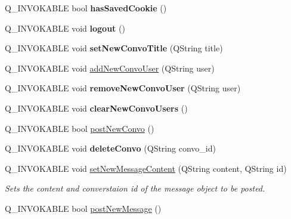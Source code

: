 \begin{DoxyCompactItemize}
\item 
\hypertarget{classHttpManager_ae8be30969ab90769d320474cba273cea}{Q\-\_\-\-I\-N\-V\-O\-K\-A\-B\-L\-E bool {\bfseries has\-Saved\-Cookie} ()}\label{classHttpManager_ae8be30969ab90769d320474cba273cea}

\item 
\hypertarget{classHttpManager_a69067bb2736567a01f69595fac80398b}{Q\-\_\-\-I\-N\-V\-O\-K\-A\-B\-L\-E void {\bfseries logout} ()}\label{classHttpManager_a69067bb2736567a01f69595fac80398b}

\item 
\hypertarget{classHttpManager_abc77a75cfec070dc986707bdab152c49}{Q\-\_\-\-I\-N\-V\-O\-K\-A\-B\-L\-E void {\bfseries set\-New\-Convo\-Title} (Q\-String title)}\label{classHttpManager_abc77a75cfec070dc986707bdab152c49}

\item 
Q\-\_\-\-I\-N\-V\-O\-K\-A\-B\-L\-E void \hyperlink{classHttpManager_ac345aafb8d298dd34573971f3a7ad242}{add\-New\-Convo\-User} (Q\-String user)
\item 
\hypertarget{classHttpManager_afc880ea260ad8d393259f44762799278}{Q\-\_\-\-I\-N\-V\-O\-K\-A\-B\-L\-E void {\bfseries remove\-New\-Convo\-User} (Q\-String user)}\label{classHttpManager_afc880ea260ad8d393259f44762799278}

\item 
\hypertarget{classHttpManager_aa8bf26e7de4b36c0e96ee06baccfd933}{Q\-\_\-\-I\-N\-V\-O\-K\-A\-B\-L\-E void {\bfseries clear\-New\-Convo\-Users} ()}\label{classHttpManager_aa8bf26e7de4b36c0e96ee06baccfd933}

\item 
Q\-\_\-\-I\-N\-V\-O\-K\-A\-B\-L\-E bool \hyperlink{classHttpManager_a1abaa98249ae82e1742b3ffbcf33fa4f}{post\-New\-Convo} ()
\item 
\hypertarget{classHttpManager_a97d6513de9a9c490dcd982921d320104}{Q\-\_\-\-I\-N\-V\-O\-K\-A\-B\-L\-E void {\bfseries delete\-Convo} (Q\-String convo\-\_\-id)}\label{classHttpManager_a97d6513de9a9c490dcd982921d320104}

\item 
Q\-\_\-\-I\-N\-V\-O\-K\-A\-B\-L\-E void \hyperlink{classHttpManager_ae665ee770c4ee653743a067b9bb8efff}{set\-New\-Message\-Content} (Q\-String content, Q\-String id)
\begin{DoxyCompactList}\small\item\em Sets the content and converstaion id of the message object to be posted. \end{DoxyCompactList}\item 
\hypertarget{classHttpManager_a695213e7f8b379811f09846e979fd50e}{Q\-\_\-\-I\-N\-V\-O\-K\-A\-B\-L\-E bool \hyperlink{classHttpManager_a695213e7f8b379811f09846e979fd50e}{post\-New\-Message} ()}\label{classHttpManager_a695213e7f8b379811f09846e979fd50e}


\end{DoxyCompactItemize}
